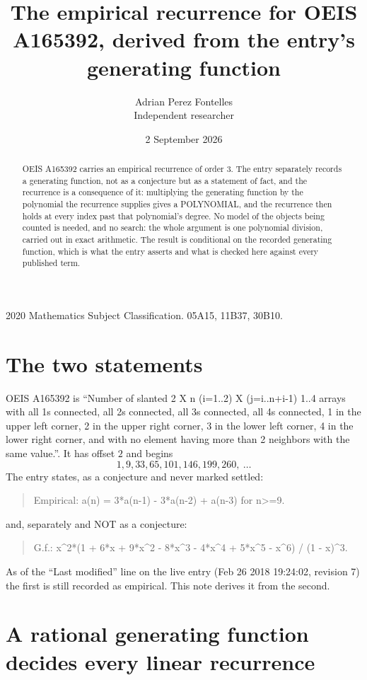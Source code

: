 \documentclass[11pt,a4paper]{article}
\title{The empirical recurrence for OEIS A165392, derived from the entry's generating function}
\author{Adrian Perez Fontelles\\ \small Independent researcher}
\date{2 September 2026}
\theoremstyle{plain}
\theoremstyle{definition}
\begin{document}
\maketitle

\begin{abstract}
OEIS A165392 carries an empirical recurrence of order $3$. The entry separately records a
generating function, not as a conjecture but as a statement of fact, and the recurrence is a
consequence of it: multiplying the generating function by the polynomial the recurrence
supplies gives a POLYNOMIAL, and the recurrence then holds at every index past that
polynomial's degree. No model of the objects being counted is needed, and no search: the
whole argument is one polynomial division, carried out in exact arithmetic. The result is
conditional on the recorded generating function, which is what the entry asserts and what is
checked here against every published term.
\end{abstract}

\noindent\small 2020 Mathematics Subject Classification. 05A15, 11B37, 30B10.\normalsize

\section{The two statements}

OEIS A165392 is ``Number of slanted 2 X n (i=1..2) X (j=i..n+i-1) 1..4 arrays with all 1s connected, all 2s connected, all 3s connected, all 4s connected, 1 in the upper left corner, 2 in the upper right corner, 3 in the lower left corner, 4 in the lower right corner, and with no element having more than 2 neighbors with the same value.''. It has offset $2$ and begins
\[
1, 9, 33, 65, 101, 146, 199, 260,\ \dots
\]
The entry states, as a conjecture and never marked settled:
\begin{quote}
Empirical: a(n) = 3*a(n-1) - 3*a(n-2) + a(n-3) for n>=9.
\end{quote}
and, separately and NOT as a conjecture:
\begin{quote}
G.f.: x\^{}2*(1 + 6*x + 9*x\^{}2 - 8*x\^{}3 - 4*x\^{}4 + 5*x\^{}5 - x\^{}6) / (1 - x)\^{}3.
\end{quote}
As of the ``Last modified'' line on the live entry (Feb 26 2018 19:24:02, revision 7) the first is still
recorded as empirical. This note derives it from the second.

\section{A rational generating function decides every linear recurrence}
\end{document}
